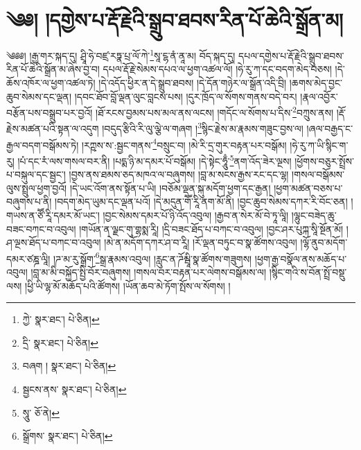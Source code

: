 \setcounter{footnote}{0} 
\chapter{༄༅། །དགྱེས་པ་རྡོ་རྗེའི་སྒྲུབ་ཐབས་རིན་པོ་ཆེའི་སྒྲོན་མ།}༄༅༅། །རྒྱ་གར་སྐད་དུ། ཤྲཱི་ཧེ་བཛྲ་རཏྣ་པྲ་ལོ་ཀེ་\footnote{ཀྱེ་  སྣར་ཐང་།  པེ་ཅིན། }སཱ་ངྷ་ནཾ་ནཱ་མ། བོད་སྐད་དུ། དཔལ་དགྱེས་པ་རྡོ་རྗེའི་སྒྲུབ་ཐབས་རིན་པོ་ཆེའི་སྒྲོན་མ་ཞེས་བྱ་བ། དཔལ་རྡོ་རྗེ་སེམས་དཔའ་ལ་ཕྱག་འཚལ་ལོ། །ཧེ་རུ་ཀ་དང་བདག་མེད་བཅས། །དེ་ཆོས་འཁོར་ལ་ཕྱག་འཚལ་ཏེ། །དེ་འདོད་ཕྱིར་ན་དེ་སྒྲུབ་ཐབས། །དེ་དོན་གཉེར་ལ་སྒྲོན་འདི་བྲི། །ཆགས་མེད་བྱང་ཆུབ་སེམས་དང་ལྡན། །དབང་ཐོབ་བློ་ལྡན་ལུང་བླངས་པས། །དུར་ཁྲོད་ལ་སོགས་གནས་བདེ་བར། །རྣལ་འབྱོར་བརྩོན་པས་བསྒྲུབ་པར་བྱའོ། །ཐོ་རངས་བྱམས་པས་མལ་ནས་ལངས། །གདོང་ལ་སོགས་པ་དིས་\footnote{དྲི་  སྣར་ཐང་།  པེ་ཅིན། }བཀྲུས་ནས། །རྡོ་རྗེས་མཚན་པའི་སྟན་ལ་འདུག །བདུད་རྩིའི་རི་ལུ་ལྕེ་ལ་གཞག །\footnote{བཞག །  སྣར་ཐང་།  པེ་ཅིན། }སྙིང་རྗེས་མ་རྣམས་གཟུང་བྱས་ལ། །ཞལ་བརྒྱད་ང་རྒྱལ་བདག་བསྒོམས་ཏེ། །རཀྵས་ས་:སྦྱང་གནས་\footnote{སྦྱངས་ནས་  སྣར་ཐང་།  པེ་ཅིན། }བསྲུང་བ། །མེ་རི་དྲ་གུར་བརྟན་པར་བསྒོམ། །ཧེ་རུ་ཀ་ཡི་སྙིང་ག་རུ། །པཾ་དང་རཾ་ལས་གསལ་བར་ནི། །པདྨ་ཉི་མ་དམར་པོ་བསྒོམ། །དེ་སྟེང་ཧཱུྃ་\footnote{སཱུ་  ཅོ་ནེ། }ནག་འོད་ཟེར་ལྔས། །ཕྱོགས་བཅུར་སྤྲོས་པ་བསྐུལ་དང་སྦྱང་། །བྱས་ནས་ཐམས་ཅད་མཁའ་ལ་བཞུགས། །བླ་མ་སངས་རྒྱས་རང་དང་ལྷ། །གསལ་བསྒོམས་ལུས་སྤྲུལ་ཕྱག་བྱའོ། །དེ་ཡང་འོག་ནས་སྟོན་པ་ཡི། །བཅོམ་ལྡན་སྐུ་མདོག་ཕྱག་དང་རྒྱན། །ཕྱག་མཚན་བཅས་པ་བཞུགས་པ་ནི། །བདག་མེད་ཡུམ་དང་ལྡན་པའོ། །དེ་མདུན་གཽ་རཱི་ནག་མོ་ནི། །བྱང་ཆུབ་སེམས་དཀར་རི་བོང་ཅན། །གཡས་ན་ཙཽ་རཱི་དམར་མོ་ཡང་། །བྱང་སེམས་དམར་པོ་ཉི་འོད་འབུལ། །རྒྱབ་ན་སེར་མོ་བེ་ཏཱ་ལཱི། །ལྷུང་བཟེད་ཆུ་བཟང་བཀང་བ་འབུལ། །གཡོན་ན་ལྗང་གུ་གྷསྨ་རཱི། །དྲི་བཟང་ཐོད་པ་བཀང་བ་འབུལ། །བྱང་ཤར་པུཀྐ་སཱི་སྔོན་མོ། །ཤ་ལྔས་ཐོད་པ་བཀང་བ་འབུལ། །མེ་ན་མདོག་དཀར་ཤ་བ་རཱི། །རོ་ལྡན་བཏུང་བ་སྣ་ཚོགས་འབུལ། །ལྷོ་ནུབ་མདོག་དམར་ཙཎྜ་ལཱི། །ཌ་མ་རུ་སྒྲོག་\footnote{སྒྲོགས་  སྣར་ཐང་།  པེ་ཅིན། }སྒྲ་རྣམས་འབུལ། །རླུང་ན་ཌོམྦཱི་སྣ་ཚོགས་གཟུགས། །ཕྱག་རྒྱ་བསྣོལ་ནས་མཆོད་པ་འབུལ། །བླ་མ་མི་བསྐྱོད་སྤྱི་བོར་བཞུགས། །གསལ་བར་བརྟན་པར་ལེགས་བསྒོམས་ལ། །སྙིང་གའི་ས་བོན་སྤྲོ་བསྡུ་ལས། །ཕྱི་ཡི་ལྷ་མོ་མཆོད་པའི་ཚོགས། །ཡོན་ཆབ་མེ་ཏོག་སྤོས་ལ་སོགས། །
